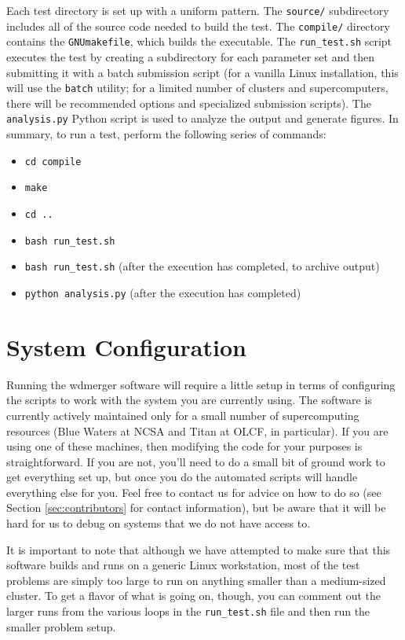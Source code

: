 \documentclass[12pt]{book}
\begin{document}
Each test directory is set up with a uniform pattern. The \texttt{source/} subdirectory includes all of the source code
needed to build the test. The \texttt{compile/} directory contains the \texttt{GNUmakefile}, which builds the executable.
The \texttt{run\_test.sh} script executes the test by creating a subdirectory
for each parameter set and then submitting it with a batch submission script (for a vanilla Linux installation,
this will use the \texttt{batch} utility; for a limited number of clusters and supercomputers, 
there will be recommended options and specialized submission scripts). The \texttt{analysis.py} Python script
is used to analyze the output and generate figures. In summary, to run a test, perform the following series of commands:
\begin{itemize}
  \item \texttt{cd compile}
  \item \texttt{make}
  \item \texttt{cd ..}
  \item \texttt{bash run\_test.sh}
  \item \texttt{bash run\_test.sh} (after the execution has completed, to archive output)
  \item \texttt{python analysis.py} (after the execution has completed)
\end{itemize}



\chapter{System Configuration}

Running the wdmerger software will require a little setup in terms of configuring the 
scripts to work with the system you are currently using. The software is currently actively 
maintained only for a small number of supercomputing resources (Blue Waters at NCSA 
and Titan at OLCF, in particular). If you are using one of these machines, then 
modifying the code for your purposes is straightforward. If you are not, you'll need to do a 
small bit of ground work to get everything set up, but once you do the automated scripts 
will handle everything else for you. Feel free to contact us for advice on how to do so 
(see Section \ref{sec:contributors} for contact information), but be aware that it will be 
hard for us to debug on systems that we do not have access to. 

It is important to note that although we have attempted to 
make sure that this software builds and runs on a generic Linux workstation, most of the test 
problems are simply too large to run on anything smaller than a medium-sized cluster. To get a flavor 
of what is going on, though, you can comment out the larger runs from the various loops in the 
\texttt{run\_test.sh} file and then run the smaller problem setup.
\end{document}
